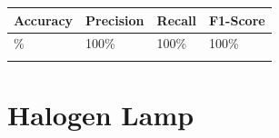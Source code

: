 
{\def\LTcaptype{none} %
\begin{longtable}[]{@{}llll@{}}
\toprule\noalign{}
\textbf{Accuracy} & \textbf{Precision} & \textbf{Recall} &
\textbf{F1-Score} \\
\midrule\noalign{}
\endhead
100\% & 100\% & 100\% & 100\% \\
\bottomrule\noalign{}
\end{longtable}
}

\section{Halogen Lamp}\label{appendix-e.2.-arc-fault-test-result-for-halogen-lamp}


